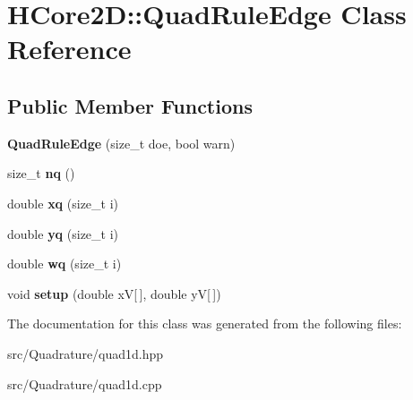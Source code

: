 \hypertarget{classHCore2D_1_1QuadRuleEdge}{}\section{H\+Core2D\+:\+:Quad\+Rule\+Edge Class Reference}
\label{classHCore2D_1_1QuadRuleEdge}
\subsection*{Public Member Functions}
\begin{DoxyCompactItemize}
\item 
\mbox{\label{classHCore2D_1_1QuadRuleEdge_abb254b22a706f3781b2b8a7b3fafa288}} 
{\bfseries Quad\+Rule\+Edge} (size\+\_\+t doe, bool warn)
\item 
\mbox{\label{classHCore2D_1_1QuadRuleEdge_af245dd9ab99a15742641d81f5508041a}} 
size\+\_\+t {\bfseries nq} ()
\item 
\mbox{\label{classHCore2D_1_1QuadRuleEdge_a1b03cf6a6800470a027f570d44338a1f}} 
double {\bfseries xq} (size\+\_\+t i)
\item 
\mbox{\label{classHCore2D_1_1QuadRuleEdge_ac272eee335dc95a46787e1a054b38cb7}} 
double {\bfseries yq} (size\+\_\+t i)
\item 
\mbox{\label{classHCore2D_1_1QuadRuleEdge_a3fc5a686c8018dbea8ec3a120ad6d9bc}} 
double {\bfseries wq} (size\+\_\+t i)
\item 
\mbox{\label{classHCore2D_1_1QuadRuleEdge_a56ca5d37f1c93f74aba256e310392d00}} 
void {\bfseries setup} (double xV\mbox{[}$\,$\mbox{]}, double yV\mbox{[}$\,$\mbox{]})
\end{DoxyCompactItemize}


The documentation for this class was generated from the following files\+:\begin{DoxyCompactItemize}
\item 
src/\+Quadrature/quad1d.\+hpp\item 
src/\+Quadrature/quad1d.\+cpp\end{DoxyCompactItemize}
